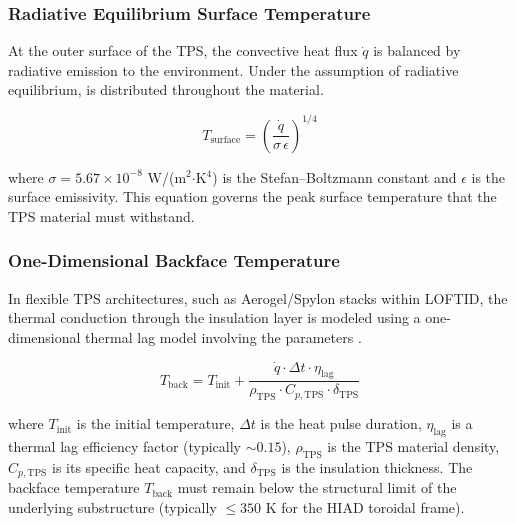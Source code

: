 \subsubsection*{Radiative Equilibrium Surface Temperature}
At the outer surface of the TPS, the convective heat flux $\dot{q}$ is balanced by radiative emission to the environment. Under the assumption of radiative equilibrium, \cite{AndersonHypersonic}is distributed throughout the material.

\begin{equation}
    T_{\text{surface}} = \left( \frac{\dot{q}}{\sigma \, \epsilon} \right)^{1/4}
    \label{eq:radiative_equilibrium}
\end{equation}

\noindent where $\sigma = 5.67 \times 10^{-8}$ W/(m$^{2}$$\cdot$K$^{4}$) is the Stefan--Boltzmann constant and $\epsilon$ is the surface emissivity. This equation governs the peak surface temperature that the TPS material must withstand.

\subsubsection*{One-Dimensional Backface Temperature}
In flexible TPS architectures, such as Aerogel/Spylon stacks within LOFTID, the thermal conduction through the insulation layer is modeled using a one-dimensional thermal lag model involving the parameters \cite{hollis2017backface}.

\begin{equation}
    T_{\text{back}} = T_{\text{init}} + \frac{\dot{q} \cdot \Delta t \cdot \eta_{\text{lag}}}{\rho_{\text{TPS}} \cdot C_{p,\text{TPS}} \cdot \delta_{\text{TPS}}}
    \label{eq:backface_temperature}
\end{equation}

\noindent where $T_{\text{init}}$ is the initial temperature, $\Delta t$ is the heat pulse duration, $\eta_{\text{lag}}$ is a thermal lag efficiency factor (typically $\sim 0.15$), $\rho_{\text{TPS}}$ is the TPS material density, $C_{p,\text{TPS}}$ is its specific heat capacity, and $\delta_{\text{TPS}}$ is the insulation thickness. The backface temperature $T_{\text{back}}$ must remain below the structural limit of the underlying substructure (typically $\leq 350$ K for the HIAD toroidal frame).

